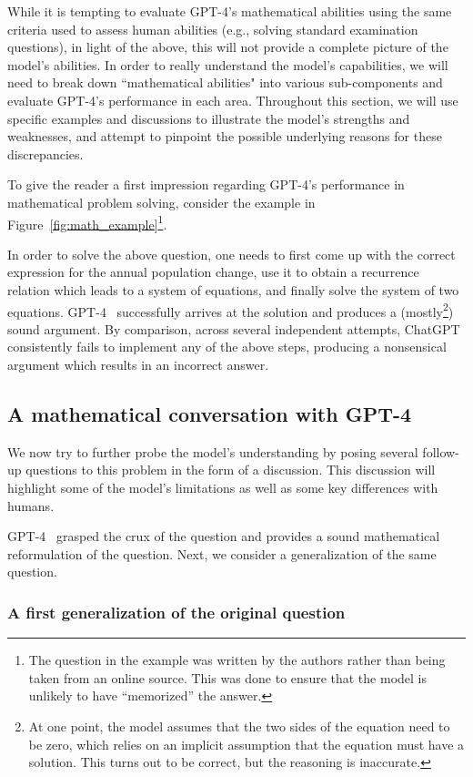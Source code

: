 While it is tempting to evaluate GPT-4's mathematical abilities using the same criteria used to assess human abilities (e.g., solving standard examination questions), in light of the above, this will not provide a complete picture of the model's abilities. In order to really understand the model's capabilities, we will need to break down ``mathematical abilities" into various sub-components and evaluate GPT-4's performance in each area. Throughout this section, we will use specific examples and discussions to illustrate the model's strengths and weaknesses, and attempt to pinpoint the possible underlying reasons for these discrepancies. 

To give the reader a first impression regarding GPT-4's performance in mathematical problem solving, consider the example in Figure~\ref{fig:math_example}\footnote{The question in the example was written by the authors rather than being taken from an online source. This was done to ensure that the model is unlikely to have ``memorized'' the answer.}.

In order to solve the above question, one needs to first come up with the correct expression for the annual population change, use it to obtain a recurrence relation which leads to a system of equations, and finally solve the system of two equations. GPT-4 \ successfully arrives at the solution and produces a (mostly\footnote{At one point, the model assumes that the two sides of the equation need to be zero, which relies on an implicit assumption that the equation must have a solution. This turns out to be correct, but the reasoning is inaccurate.}) sound argument. By comparison, across several independent attempts, ChatGPT consistently fails to implement any of the above steps, producing a nonsensical argument which results in an incorrect answer.

\subsection{A mathematical conversation with GPT-4} We now try to further probe the model's understanding by posing several follow-up questions to this problem in the form of a discussion. This discussion will highlight some of the model's limitations as well as some key differences with humans.

GPT-4 \ grasped the crux of the question and provides a sound mathematical reformulation of the question. Next, we consider a generalization of the same question.

\subsubsection{A first generalization of the original question}

